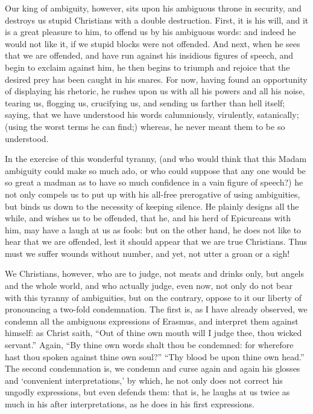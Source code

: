 Our king of ambiguity, however, sits upon his ambiguous throne in security, and destroys us stupid Christians with a double destruction. First, it is his will, and it is a great pleasure to him, to offend us by his ambiguous words: and indeed he would not like it, if we stupid blocks were not offended. And next, when he sees that we are offended, and have run against his insidious figures of speech, and begin to exclaim against him, he then begins to triumph and rejoice that the desired prey has been caught in his snares. For now, having found an opportunity of displaying his rhetoric, he rushes upon us with all his powers and all his noise, tearing us, flogging us, crucifying us, and sending us farther than hell itself; saying, that we have understood his words calumniously, virulently, satanically; (using the worst terms he can find;) whereas, he never meant them to be so understood.

In the exercise of this wonderful tyranny, (and who would think that this Madam ambiguity could make so much ado, or who could suppose that any one would be so great a madman as to have so much confidence in a vain figure of speech?) he not only compels us to put up with his all-free prerogative of using ambiguities, but binds us down to the necessity of keeping silence. He plainly designs all the while, and wishes us to be offended, that he, and his herd of Epicureans with him, may have a laugh at us as fools: but on the other hand, he does not like to hear that we are offended, lest it should appear that we are true Christians. Thus must we suffer wounds without number, and yet, not utter a groan or a sigh!

We Christians, however, who are to judge, not meats and drinks only, but angels and the whole world, and who actually judge, even now, not only do not bear with this tyranny of ambiguities, but on the contrary, oppose to it our liberty of pronouncing a two-fold condemnation. The first is, as I have already observed, we condemn all the ambiguous expressions of Erasmus, and interpret them against himself: as Christ saith, “Out of thine own mouth will I judge thee, thou wicked servant.” Again, “By thine own words shalt thou be condemned: for wherefore hast thou spoken against thine own soul?” “Thy blood be upon thine own head.” The second condemnation is, we condemn and curse again and again his glosses and ‘convenient interpretations,’ by which, he not only does not correct his ungodly expressions, but even defends them: that is, he laughs at us twice as much in his after interpretations, as he does in his first expressions.

